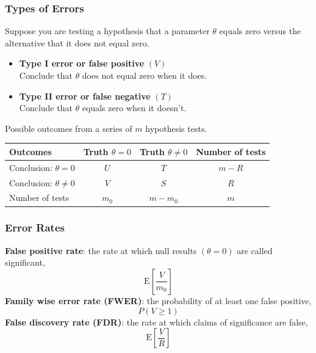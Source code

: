 \documentclass[a4paper]{article}\usepackage[]{graphicx}\usepackage[]{xcolor}
\begin{document}
\subsubsection{Types of Errors}
Suppose you are testing a hypothesis that a parameter \( \theta \) equals zero versus the alternative that it does not equal zero.
\begin{itemize}
	\item \textbf{Type I error or false positive} \( (V) \)\\
	Conclude that \( \theta \) does not equal zero when it does.
	\item \textbf{Type II error or false negative} \( (T) \)\\
	Conclude that \( \theta \) equals zero when it doesn't.
\end{itemize}
Possible outcomes from a series of \( m \) hypothesis tests.
\begin{table}[H]
	\centering
	\begin{tabular}{@{}lccc@{}}
	\toprule
	Outcomes                        & Truth \( \theta = 0 \) & Truth \( \theta \neq 0 \) & Number of tests \\ \midrule
	Conclusion: \( \theta = 0 \)    & \( U \)                & \( T \)                   & \( m - R \)     \\
	Conclusion: \( \theta \neq 0 \) & \( V \)                & \( S \)                   & \( R \)         \\
	Number of tests                 & \( m_0 \)              & \( m - m_0 \)             & \( m \)         \\ \bottomrule
	\end{tabular}
\end{table}
\subsubsection{Error Rates}
\textcolor{myred}{\textbf{False positive rate}}: the rate at which null results \( (\theta = 0) \) are called significant,
\[
	\mathrm{E} \left[ \frac{V}{m_0} \right]
\]
\textcolor{myred}{\textbf{Family wise error rate (FWER)}}: the probability of at least one false positive,
\[
	P(V \geq 1)
\]
\textcolor{myred}{\textbf{False discovery rate (FDR)}}: the rate at which claims of significance are false,
\[
	\mathrm{E} \left[ \frac{V}{R} \right]
\]
\end{document}
